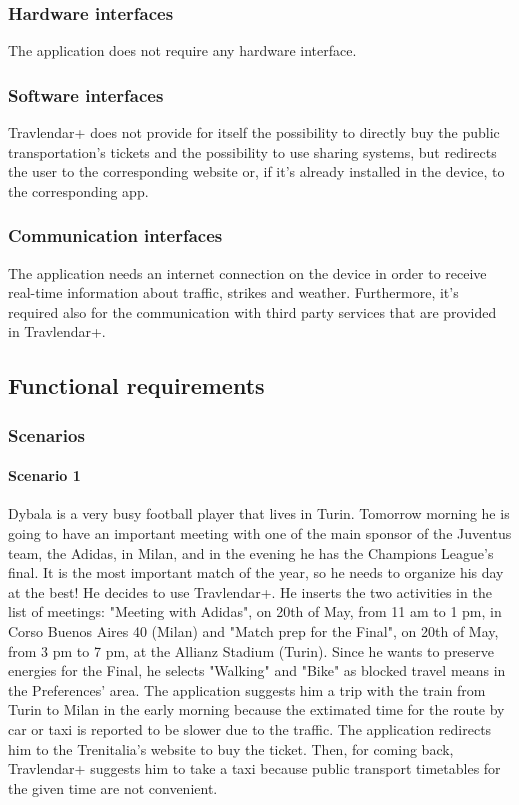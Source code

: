\documentclass[12pt,titlepage]{article}
\begin{document}
\subsubsection{Hardware interfaces}\label{sec:mod1}
The application does not require any hardware interface. 


\subsubsection{Software interfaces}\label{sec:mod1}
Travlendar+ does not provide for itself the possibility to directly buy the public transportation's tickets and the possibility to use sharing systems, but redirects the user to the corresponding website or, if it's already installed in the device, to the corresponding app.

\subsubsection{Communication interfaces}\label{sec:mod1}
The application needs an internet connection on the device in order to receive real-time information about traffic, strikes and weather. Furthermore, it's required also for the communication with third party services that are provided in Travlendar+. 

\subsection{Functional requirements}\label{sec:mod1}
\subsubsection{Scenarios}\label{sec:mod1}
\paragraph{Scenario 1}
Dybala is a very busy football player that lives in Turin. Tomorrow morning he is going to have an important meeting with one of the main sponsor of the Juventus team, the Adidas, in Milan, and in the evening he has the Champions League's final. It is the most important match of the year, so he needs to organize his day at the best! He decides to use Travlendar+. He inserts the two activities in the list of meetings: "Meeting with Adidas", on 20th of May, from 11 am to 1 pm, in Corso Buenos Aires 40 (Milan) and "Match prep for the Final", on 20th of May, from 3 pm to 7 pm, at the Allianz Stadium (Turin). Since he wants to preserve energies for the Final, he selects "Walking" and "Bike" as blocked travel means in the Preferences' area. The application suggests him a trip with the train from Turin to Milan in the early morning because the extimated time for the route by car or taxi is reported to be slower due to the traffic. The application redirects him to the Trenitalia's website to buy the ticket. Then, for coming back, Travlendar+ suggests him to take a taxi because public transport timetables for the given time are not convenient. 
\end{document}
